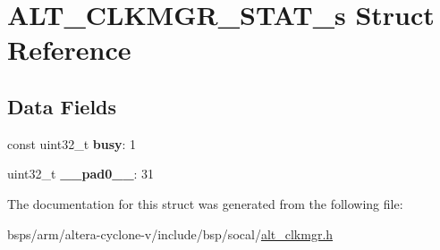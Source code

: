 \hypertarget{structALT__CLKMGR__STAT__s}{}\section{A\+L\+T\+\_\+\+C\+L\+K\+M\+G\+R\+\_\+\+S\+T\+A\+T\+\_\+s Struct Reference}
\label{structALT__CLKMGR__STAT__s}
\subsection*{Data Fields}
\begin{DoxyCompactItemize}
\item 
\mbox{\label{structALT__CLKMGR__STAT__s_a4a4e05372c49eef86b0c6be1ddc43ce5}} 
const uint32\+\_\+t {\bfseries busy}\+: 1
\item 
\mbox{\label{structALT__CLKMGR__STAT__s_a18b10d15de0434b41bee40c834d28f96}} 
uint32\+\_\+t {\bfseries \+\_\+\+\_\+pad0\+\_\+\+\_\+}\+: 31
\end{DoxyCompactItemize}


The documentation for this struct was generated from the following file\+:\begin{DoxyCompactItemize}
\item 
bsps/arm/altera-\/cyclone-\/v/include/bsp/socal/\mbox{\hyperlink{alt__clkmgr_8h}{alt\+\_\+clkmgr.\+h}}\end{DoxyCompactItemize}
